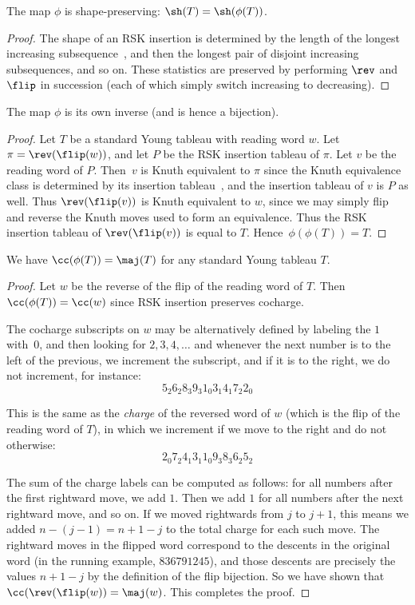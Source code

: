\begin{lemma}
	The map $\phi$ is shape-preserving: $\sh(T)=\sh(\phi(T))$.
\end{lemma}
\begin{proof}
	The shape of an RSK insertion is determined by the length of the longest increasing subsequence~\cite{Fulton}, and then the longest pair of disjoint increasing subsequences, and so on.  These statistics are preserved by performing $\rev$ and $\flip$ in succession (each of which simply switch increasing to decreasing).      
\end{proof}

\begin{lemma}
	The map $\phi$ is its own inverse (and is hence a bijection).
\end{lemma}

\begin{proof}
	Let $T$ be a standard Young tableau with reading word $w$.  Let $\pi=\rev(\flip(w))$, and let $P$ be the RSK insertion tableau of $\pi$.  Let $v$ be the reading word of $P$.  Then~$v$ is Knuth equivalent to $\pi$ since the Knuth equivalence class is determined by its insertion tableau~\cite{Fulton}, and the insertion tableau of $v$ is $P$ as well.  Thus $\rev(\flip(v))$ is Knuth equivalent to $w$, since we may simply flip and reverse the Knuth moves used to form an equivalence. 
	Thus the RSK insertion tableau of $\rev(\flip(v))$ is equal to $T$.  Hence~$\phi(\phi(T))=T$.
\end{proof}

\begin{prop}
	We have $\cc(\phi(T))=\maj(T)$ for any standard Young tableau $T$.    
\end{prop}

\begin{proof}
	Let $w$ be the reverse of the flip of the reading word of $T$. Then $\cc(\phi(T))=\cc(w)$ since RSK insertion preserves cocharge.  
	
	The cocharge subscripts on $w$ may be alternatively defined by labeling the $1$ with~$0$, and then looking for $2,3,4,\ldots$ and whenever the next number is to the left of the previous, we increment the subscript, and if it is to the right, we do not increment, for instance:
	$$5_2 6_2 8_3 9_3 1_0 3_1 4_1 7_2 2_0$$
	
	This is the same as the \textit{charge} of the reversed word of $w$ (which is the flip of the reading word of $T$), in which we increment if we move to the right and do not otherwise:
	$$2_0 7_2 4_1 3_1 1_0 9_3 8_3 6_2 5_2$$
	
	The sum of the charge labels can be computed as follows: for all numbers after the first rightward move, we add $1$.  Then we add $1$ for all numbers after the next rightward move, and so on.  If we moved rightwards from $j$ to $j+1$, this means we added $n-(j-1)=n+1-j$ to the total charge for each such move.  The rightward moves in the flipped word correspond to the descents in the original word (in the running example, $836791245$), and those descents are precisely the values $n+1-j$ by the definition of the flip bijection.  So we have shown that $\cc(\rev(\flip(w))=\maj(w)$.  This completes the proof. 
\end{proof}

